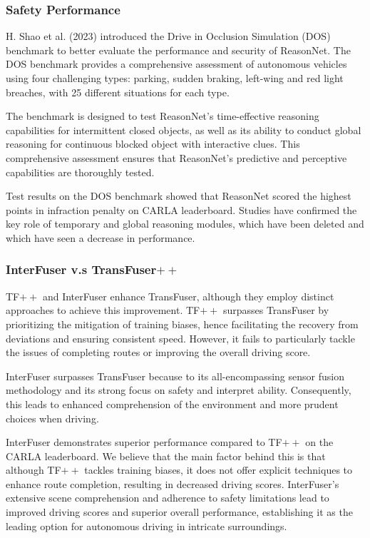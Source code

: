 \subsubsection{Safety Performance} %

H. Shao et al. (2023) introduced the Drive in Occlusion Simulation (DOS) benchmark to better evaluate the performance and security of ReasonNet. The DOS benchmark provides a comprehensive assessment of autonomous vehicles using four challenging types: parking, sudden braking, left-wing and red light breaches, with 25 different situations for each type.

The benchmark is designed to test ReasonNet's time-effective reasoning capabilities for intermittent closed objects, as well as its ability to conduct global reasoning for continuous blocked object with interactive clues. This comprehensive assessment ensures that ReasonNet's predictive and perceptive capabilities are thoroughly tested.

Test results on the DOS benchmark showed that ReasonNet scored the highest points in infraction penalty on CARLA leaderboard. Studies have confirmed the key role of temporary and global reasoning modules, which have been deleted and which have seen a decrease in performance.



\subsubsection{InterFuser v.s TransFuser\texorpdfstring{$++$}{++}}
TF$++$ and InterFuser enhance TransFuser, although they employ distinct approaches to achieve this improvement. TF$++$ surpasses TransFuser by prioritizing the mitigation of training biases, hence facilitating the recovery from deviations and ensuring consistent speed. However, it fails to particularly tackle the issues of completing routes or improving the overall driving score.

InterFuser surpasses TransFuser because to its all-encompassing sensor fusion methodology and its strong focus on safety and interpret ability. Consequently, this leads to enhanced comprehension of the environment and more prudent choices when driving.

InterFuser demonstrates superior performance compared to TF$++$ on the CARLA leaderboard. We believe that the main factor behind this is that although TF$++$ tackles training biases, it does not offer explicit techniques to enhance route completion, resulting in decreased driving scores. InterFuser's extensive scene comprehension and adherence to safety limitations lead to improved driving scores and superior overall performance, establishing it as the leading option for autonomous driving in intricate surroundings.

